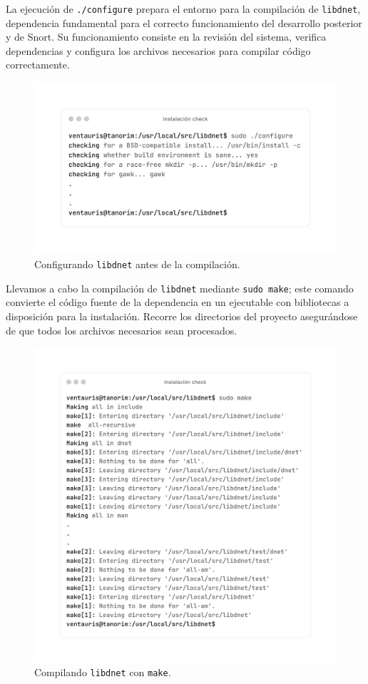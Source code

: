 \documentclass[12pt,a4paper]{report}
\begin{document}
La ejecución de \texttt{./configure} prepara el entorno para la compilación de \texttt{libdnet}, dependencia fundamental para el correcto funcionamiento del desarrollo posterior y de Snort. Su funcionamiento consiste en la revisión del sistema, verifica dependencias y configura los archivos necesarios para compilar código correctamente.

\begin{figure}[H]
	\centering
	\includegraphics[scale=0.12]{instalacion_snort/3-3.png}
	\caption{Configurando \texttt{libdnet} antes de la compilación.}
\end{figure}

\newpage

Llevamos a cabo la compilación de \texttt{libdnet} mediante \texttt{sudo make}; este comando convierte el código fuente de la dependencia en un ejecutable con bibliotecas a disposición para la instalación. Recorre los directorios del proyecto asegurándose de que todos los archivos necesarios sean procesados.

\begin{figure}[H]
	\centering
	\includegraphics[scale=0.12]{instalacion_snort/4-4.png}
	\caption{Compilando \texttt{libdnet} con \texttt{make}.}
\end{figure}
\end{document}

